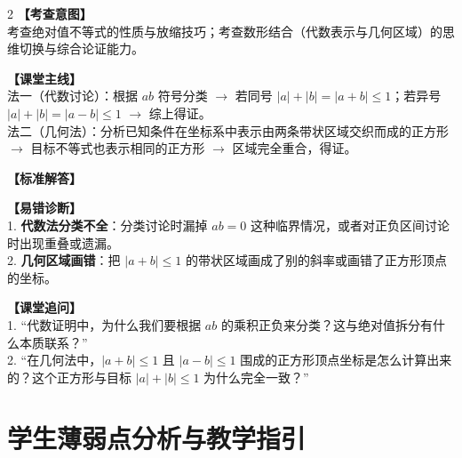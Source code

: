 \documentclass[12pt,a4paper]{ctexart}
\begin{document}
\begin{paracol}{2}
  \textbf{【考查意图】}\\
  考查绝对值不等式的性质与放缩技巧；考查数形结合（代数表示与几何区域）的思维切换与综合论证能力。
  
  \textbf{【课堂主线】}\\
  法一（代数讨论）：根据 \(ab\) 符号分类 \(\to\) 若同号 \(|a|+|b|=|a+b| \leqslant 1\)；若异号 \(|a|+|b|=|a-b| \leqslant 1\) \(\to\) 综上得证。\\
  法二（几何法）：分析已知条件在坐标系中表示由两条带状区域交织而成的正方形 \(\to\) 目标不等式也表示相同的正方形 \(\to\) 区域完全重合，得证。
  
  \textbf{【标准解答】}\\
  \qEightSolution

  \switchcolumn
  \textbf{【易错诊断】}\\
  1. \textbf{代数法分类不全}：分类讨论时漏掉 \(ab=0\) 这种临界情况，或者对正负区间讨论时出现重叠或遗漏。\\
  2. \textbf{几何区域画错}：把 \(|a+b| \leqslant 1\) 的带状区域画成了别的斜率或画错了正方形顶点的坐标。
  
  \textbf{【课堂追问】}\\
  1. “代数证明中，为什么我们要根据 \(ab\) 的乘积正负来分类？这与绝对值拆分有什么本质联系？”\\
  2. “在几何法中，\(|a+b| \leqslant 1\) 且 \(|a-b| \leqslant 1\) 围成的正方形顶点坐标是怎么计算出来的？这个正方形与目标 \(|a|+|b| \leqslant 1\) 为什么完全一致？”
\end{paracol}

\vspace{0.8em}
\par{}
\vspace{0.8em}

\newpage

\section{学生薄弱点分析与教学指引}

\begingroup
\linespread{1.4}\selectfont
\end{document}
